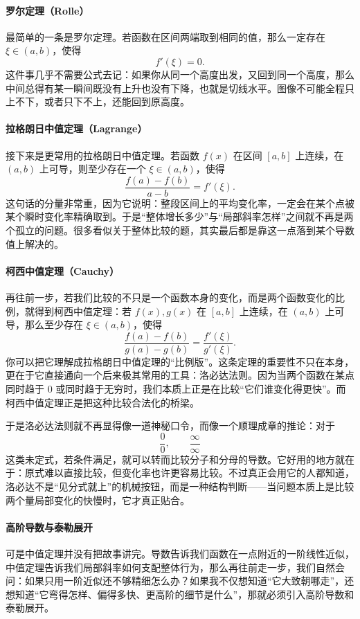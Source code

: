 \documentclass[UTF8]{ctexbook}
\begin{document}
\paragraph{罗尔定理（Rolle）}
最简单的一条是罗尔定理。若函数在区间两端取到相同的值，那么一定存在 $\xi\in(a,b)$，使得
\[
f'(\xi)=0.
\]
这件事几乎不需要公式去记：如果你从同一个高度出发，又回到同一个高度，那么中间总得有某一瞬间既没有上升也没有下降，也就是切线水平。图像不可能全程只上不下，或者只下不上，还能回到原高度。

\paragraph{拉格朗日中值定理（Lagrange）}
接下来是更常用的拉格朗日中值定理。若函数 $f(x)$ 在区间 $[a,b]$ 上连续，在 $(a,b)$ 上可导，则至少存在一个 $\xi\in(a,b)$，使得
\[
\frac{f(a)-f(b)}{a-b}=f'(\xi).
\]
这句话的分量非常重，因为它说明：整段区间上的平均变化率，一定会在某个点被某个瞬时变化率精确取到。于是“整体增长多少”与“局部斜率怎样”之间就不再是两个孤立的问题。很多看似关于整体比较的题，其实最后都是靠这一点落到某个导数值上解决的。

\paragraph{柯西中值定理（Cauchy）}
再往前一步，若我们比较的不只是一个函数本身的变化，而是两个函数变化的比例，就得到柯西中值定理：若 $f(x),g(x)$ 在 $[a,b]$ 上连续，在 $(a,b)$ 上可导，那么至少存在 $\xi\in(a,b)$，使得
\[
\frac{f(a)-f(b)}{g(a)-g(b)}=\frac{f'(\xi)}{g'(\xi)}.
\]
你可以把它理解成拉格朗日中值定理的“比例版”。这条定理的重要性不只在本身，更在于它直接通向一个后来极其常用的工具：洛必达法则。因为当两个函数在某点同时趋于 $0$ 或同时趋于无穷时，我们本质上正是在比较“它们谁变化得更快”。而柯西中值定理正是把这种比较合法化的桥梁。

于是洛必达法则就不再显得像一道神秘口令，而像一个顺理成章的推论：对于
\[
\frac00,\qquad \frac{\infty}{\infty}
\]
这类未定式，若条件满足，就可以转而比较分子和分母的导数。它好用的地方就在于：原式难以直接比较，但变化率也许更容易比较。不过真正会用它的人都知道，洛必达不是“见分式就上”的机械按钮，而是一种结构判断——当问题本质上是比较两个量局部变化的快慢时，它才真正贴合。

\paragraph{高阶导数与泰勒展开}
可是中值定理并没有把故事讲完。导数告诉我们函数在一点附近的一阶线性近似，中值定理告诉我们局部斜率如何支配整体行为，那么再往前走一步，我们自然会问：如果只用一阶近似还不够精细怎么办？如果我不仅想知道“它大致朝哪走”，还想知道“它弯得怎样、偏得多快、更高阶的细节是什么”，那就必须引入高阶导数和泰勒展开。
\end{document}
